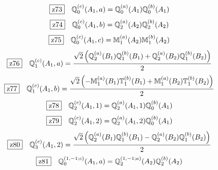 \documentclass[fleqn,10pt,landscape]{jsarticle}
\begin{document}
\begin{dmath*}
\hspace*{3mm}\fbox{z73}\quad \mathbb{Q}_{0}^{(c)}(A_{1},a)=\mathbb{Q}_{0}^{(a)}(A_{1}) \mathbb{Q}_{0}^{(b)}(A_{1})
\end{dmath*}
\begin{dmath*}
\hspace*{3mm}\fbox{z74}\quad \mathbb{Q}_{0}^{(c)}(A_{1},b)=\mathbb{Q}_{2}^{(a)}(A_{2}) \mathbb{Q}_{2}^{(b)}(A_{2})
\end{dmath*}
\begin{dmath*}
\hspace*{3mm}\fbox{z75}\quad \mathbb{Q}_{0}^{(c)}(A_{1},c)=\mathbb{M}_{1}^{(a)}(A_{2}) \mathbb{M}_{1}^{(b)}(A_{2})
\end{dmath*}
\begin{dmath*}
\hspace*{3mm}\fbox{z76}\quad \mathbb{Q}_{1}^{(c)}(A_{1},a)=\frac{\sqrt{2} \left(\mathbb{Q}_{2}^{(a)}(B_{1}) \mathbb{Q}_{1}^{(b)}(B_{1}) + \mathbb{Q}_{2}^{(a)}(B_{2}) \mathbb{Q}_{1}^{(b)}(B_{2})\right)}{2}
\end{dmath*}
\begin{dmath*}
\hspace*{3mm}\fbox{z77}\quad \mathbb{Q}_{1}^{(c)}(A_{1},b)=\frac{\sqrt{2} \left(- \mathbb{M}_{1}^{(a)}(B_{1}) \mathbb{T}_{1}^{(b)}(B_{1}) + \mathbb{M}_{1}^{(a)}(B_{2}) \mathbb{T}_{1}^{(b)}(B_{2})\right)}{2}
\end{dmath*}
\begin{dmath*}
\hspace*{3mm}\fbox{z78}\quad \mathbb{Q}_{2}^{(c)}(A_{1},1)=\mathbb{Q}_{2}^{(a)}(A_{1},1) \mathbb{Q}_{0}^{(b)}(A_{1})
\end{dmath*}
\begin{dmath*}
\hspace*{3mm}\fbox{z79}\quad \mathbb{Q}_{2}^{(c)}(A_{1},2)=\mathbb{Q}_{2}^{(a)}(A_{1},2) \mathbb{Q}_{0}^{(b)}(A_{1})
\end{dmath*}
\begin{dmath*}
\hspace*{3mm}\fbox{z80}\quad \mathbb{Q}_{3}^{(c)}(A_{1},2)=\frac{\sqrt{2} \left(\mathbb{Q}_{2}^{(a)}(B_{1}) \mathbb{Q}_{1}^{(b)}(B_{1}) - \mathbb{Q}_{2}^{(a)}(B_{2}) \mathbb{Q}_{1}^{(b)}(B_{2})\right)}{2}
\end{dmath*}
\begin{dmath*}
\hspace*{3mm}\fbox{z81}\quad \mathbb{Q}_{0}^{(1,-1;c)}(A_{1},a)=\mathbb{Q}_{2}^{(1,-1;a)}(A_{2}) \mathbb{Q}_{2}^{(b)}(A_{2})
\end{dmath*}
\end{document}
